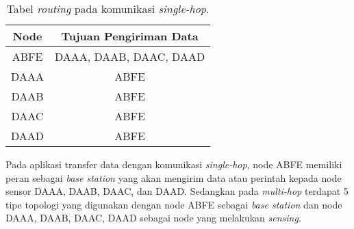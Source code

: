 \begin{table} [H]
	\centering 
	\caption{Tabel \textit{routing} pada komunikasi \textit{single-hop}.}
	\label{tab:routing_single_hop}
	\begin{tabular}{|c|c|}
        \hline
		Node & Tujuan Pengiriman Data\\
        \hline
		ABFE & DAAA, DAAB, DAAC, DAAD  \\
		DAAA & ABFE \\
		DAAB & ABFE \\
		DAAC & ABFE \\
		DAAD & ABFE \\
        \hline
	\end{tabular} 
\end{table}
Pada aplikasi transfer data dengan komunikasi \textit{single-hop}, node ABFE memiliki peran sebagai \textit{base station} yang akan mengirim data atau perintah kepada node sensor DAAA, DAAB, DAAC, dan DAAD.
Sedangkan pada \textit{multi-hop} terdapat 5 tipe topologi yang digunakan dengan node ABFE sebagai \textit{base station} dan node DAAA, DAAB, DAAC, DAAD sebagai node yang melakukan \textit{sensing}.
